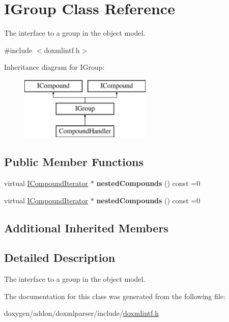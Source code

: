 \hypertarget{class_i_group}{}\section{I\+Group Class Reference}
\label{class_i_group}


The interface to a group in the object model.  




{\ttfamily \#include $<$doxmlintf.\+h$>$}

Inheritance diagram for I\+Group\+:\begin{figure}[H]
\begin{center}
\leavevmode
\includegraphics[height=3.000000cm]{class_i_group}
\end{center}
\end{figure}
\subsection*{Public Member Functions}
\begin{DoxyCompactItemize}
\item 
\mbox{\label{class_i_group_a97dee0029e5a0c45c4b6abaa63ce15d3}} 
virtual \mbox{\hyperlink{class_i_compound_iterator}{I\+Compound\+Iterator}} $\ast$ {\bfseries nested\+Compounds} () const =0
\item 
\mbox{\label{class_i_group_a97dee0029e5a0c45c4b6abaa63ce15d3}} 
virtual \mbox{\hyperlink{class_i_compound_iterator}{I\+Compound\+Iterator}} $\ast$ {\bfseries nested\+Compounds} () const =0
\end{DoxyCompactItemize}
\subsection*{Additional Inherited Members}


\subsection{Detailed Description}
The interface to a group in the object model. 

The documentation for this class was generated from the following file\+:\begin{DoxyCompactItemize}
\item 
doxygen/addon/doxmlparser/include/\mbox{\hyperlink{include_2doxmlintf_8h}{doxmlintf.\+h}}\end{DoxyCompactItemize}
